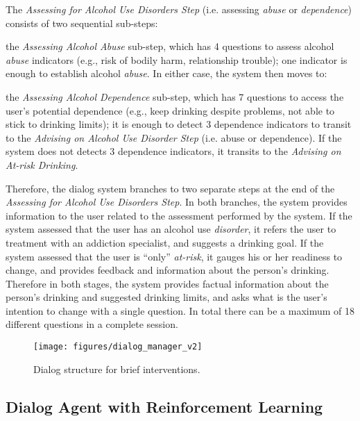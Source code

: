 \documentclass[letterpaper]{article}
\begin{document}
\begin{sloppy}
The {\em Assessing for Alcohol Use Disorders Step} (i.e. assessing {\em abuse} or {\em dependence}) 
consists of two sequential sub-steps: 
\begin{inparaenum}[1)] 
\item the {\em Assessing Alcohol Abuse} sub-step, which has 4 questions to assess alcohol {\em 
abuse} indicators (e.g., risk of bodily harm, relationship trouble); one indicator is enough to 
establish alcohol {\em abuse}.  In either case, the system then moves to: 
\item the {\em Assessing Alcohol Dependence} sub-step, 
which has  7 questions to access the user's potential dependence (e.g., keep drinking despite 
problems, not able to stick to drinking limits); it is enough to detect 3 dependence indicators to 
transit to the {\em Advising on Alcohol Use Disorder Step} (i.e. abuse or dependence).  If the 
system does not detects 3 dependence 
indicators, it transits to the {\em Advising on At-risk Drinking}. 
\end{inparaenum}

Therefore, the dialog system branches to two 
separate steps at the end of the {\em Assessing for Alcohol Use Disorders Step}. In both branches, 
the system provides information 
to the user related to the assessment performed by the system.  If the system assessed that the user 
has an alcohol use 
{\em disorder}, it refers the user to treatment with an addiction specialist, and suggests a 
drinking goal.  If 
the system assessed that the user is ``only'' {\em at-risk}, it gauges his or her readiness to 
change, and provides feedback and 
information about the person's drinking. Therefore in both stages, the system provides factual 
information about the person's drinking and suggested drinking limits, and asks what is the user's 
intention to change with a single question.  In total there can be a maximum of 18 different 
questions in a complete session.   

\begin{figure}[!t] 
\centering 
\texttt{[image: figures/dialog\_manager\_v2]} 
\caption{Dialog structure for brief interventions.} 
\label{fig:dialog_manager} 
\end{figure}

\subsection{Dialog Agent with Reinforcement Learning}


\end{sloppy}
\end{document}
